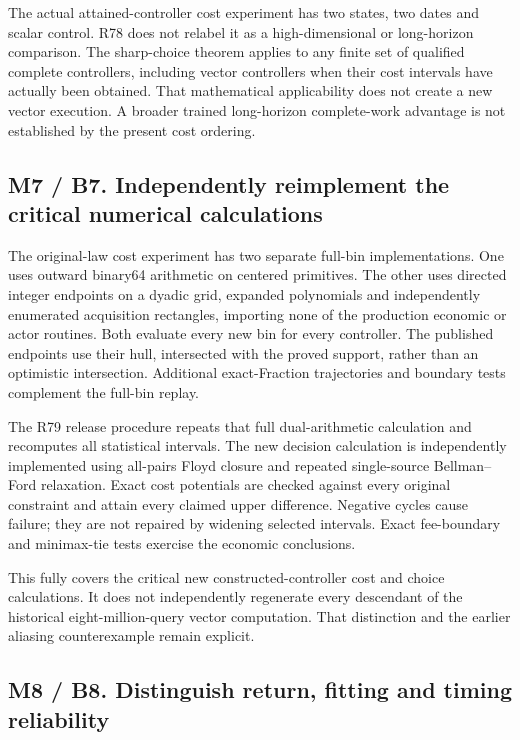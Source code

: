 The actual attained-controller cost experiment has two states, two dates
and scalar control. R78 does not relabel it as a high-dimensional or
long-horizon comparison. The sharp-choice theorem applies to any finite
set of qualified complete controllers, including vector controllers when
their cost intervals have actually been obtained. That mathematical
applicability does not create a new vector execution. A broader trained
long-horizon complete-work advantage is not established by the present
cost ordering.

\hypertarget{m7-b7.-independently-reimplement-the-critical-numerical-calculations}{%
\subsection{M7 / B7. Independently reimplement the critical numerical
calculations}\label{m7-b7.-independently-reimplement-the-critical-numerical-calculations}}

The original-law cost experiment has two separate full-bin
implementations. One uses outward binary64 arithmetic on centered
primitives. The other uses directed integer endpoints on a dyadic grid,
expanded polynomials and independently enumerated acquisition
rectangles, importing none of the production economic or actor routines.
Both evaluate every new bin for every controller. The published
endpoints use their hull, intersected with the proved support, rather
than an optimistic intersection. Additional exact-Fraction trajectories
and boundary tests complement the full-bin replay.

The R79 release procedure repeats that full dual-arithmetic calculation
and recomputes all statistical intervals. The new decision calculation
is independently implemented using all-pairs Floyd closure and repeated
single-source Bellman--Ford relaxation. Exact cost potentials are
checked against every original constraint and attain every claimed upper
difference. Negative cycles cause failure; they are not repaired by
widening selected intervals. Exact fee-boundary and minimax-tie tests
exercise the economic conclusions.

This fully covers the critical new constructed-controller cost and
choice calculations. It does not independently regenerate every
descendant of the historical eight-million-query vector computation.
That distinction and the earlier aliasing counterexample remain
explicit.

\hypertarget{m8-b8.-distinguish-return-fitting-and-timing-reliability}{%
\subsection{M8 / B8. Distinguish return, fitting and timing
reliability}\label{m8-b8.-distinguish-return-fitting-and-timing-reliability}}

